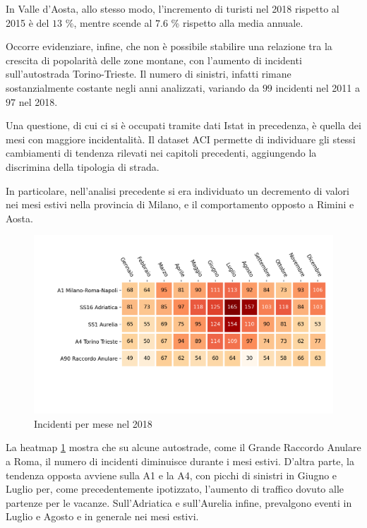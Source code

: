 \documentclass[a4paper,12pt]{report}
\begin{document}
In Valle d'Aosta, allo stesso modo, l'incremento di turisti nel 2018 
rispetto al 2015 è del $13$ \%, mentre scende al $7.6$ \% rispetto alla media annuale. 

Occorre evidenziare, infine, che non è possibile stabilire una relazione 
tra la crescita di popolarità delle zone montane, 
con l'aumento di incidenti sull'autostrada Torino-Trieste. 
Il numero di sinistri, infatti rimane sostanzialmente costante negli anni analizzati, 
variando da $99$ incidenti nel 2011 a $97$ nel 2018. 



Una questione, di cui ci si è occupati tramite dati Istat in precedenza, è 
quella dei mesi con maggiore incidentalità. 
Il dataset ACI permette di individuare gli stessi cambiamenti di tendenza rilevati nei 
capitoli precedenti, aggiungendo la discrimina della tipologia di strada. 

In particolare, nell'analisi precedente si era individuato un decremento di valori 
nei mesi estivi nella provincia di Milano, e il comportamento opposto a 
Rimini e Aosta. 

\begin{figure}
    \includegraphics[width=\linewidth]{../src/incidenti/incidenti_aci/autostrade/mesi_autostrade.png}
    \caption{Incidenti per mese nel 2018}
    \label{fig:incidenti-per-mese}
\end{figure}

La heatmap \ref{fig:incidenti-per-mese} mostra che su alcune autostrade, come il 
Grande Raccordo Anulare a Roma, il numero di incidenti diminuisce durante i mesi 
estivi. 
D'altra parte, la tendenza opposta avviene sulla A1 e la A4, 
con picchi di sinistri in Giugno e Luglio per, come precedentemente ipotizzato, 
l'aumento di traffico dovuto alle partenze per le vacanze. 
Sull'Adriatica e sull'Aurelia infine, prevalgono eventi 
in Luglio e Agosto e in generale nei mesi estivi. 
\end{document}
